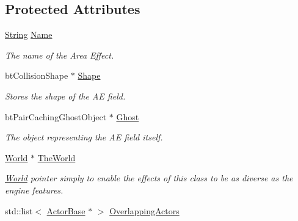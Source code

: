 \subsection*{Protected Attributes}
\begin{DoxyCompactItemize}
\item 
\hypertarget{classphys_1_1AreaEffect_a1cf5a878eb22b30a166f5b065944a986}{
\hyperlink{namespacephys_aa03900411993de7fbfec4789bc1d392e}{String} \hyperlink{classphys_1_1AreaEffect_a1cf5a878eb22b30a166f5b065944a986}{Name}}
\label{d4/d55/classphys_1_1AreaEffect_a1cf5a878eb22b30a166f5b065944a986}

\begin{DoxyCompactList}\small\item\em The name of the Area Effect. \item\end{DoxyCompactList}\item 
\hypertarget{classphys_1_1AreaEffect_af8189f9e8dc4bf04f44550918e0ee117}{
btCollisionShape $\ast$ \hyperlink{classphys_1_1AreaEffect_af8189f9e8dc4bf04f44550918e0ee117}{Shape}}
\label{d4/d55/classphys_1_1AreaEffect_af8189f9e8dc4bf04f44550918e0ee117}

\begin{DoxyCompactList}\small\item\em Stores the shape of the AE field. \item\end{DoxyCompactList}\item 
\hypertarget{classphys_1_1AreaEffect_ae730c591bf929404f337d71d4119bde8}{
btPairCachingGhostObject $\ast$ \hyperlink{classphys_1_1AreaEffect_ae730c591bf929404f337d71d4119bde8}{Ghost}}
\label{d4/d55/classphys_1_1AreaEffect_ae730c591bf929404f337d71d4119bde8}

\begin{DoxyCompactList}\small\item\em The object representing the AE field itself. \item\end{DoxyCompactList}\item 
\hypertarget{classphys_1_1AreaEffect_a3008e8e90236141ca4c21a9580e6f5de}{
\hyperlink{classphys_1_1World}{World} $\ast$ \hyperlink{classphys_1_1AreaEffect_a3008e8e90236141ca4c21a9580e6f5de}{TheWorld}}
\label{d4/d55/classphys_1_1AreaEffect_a3008e8e90236141ca4c21a9580e6f5de}

\begin{DoxyCompactList}\small\item\em \hyperlink{classphys_1_1World}{World} pointer simply to enable the effects of this class to be as diverse as the engine features. \item\end{DoxyCompactList}\item 
\hypertarget{classphys_1_1AreaEffect_a45834591f0ea49ba6657ce58d070ee9b}{
std::list$<$ \hyperlink{classphys_1_1ActorBase}{ActorBase} $\ast$ $>$ \hyperlink{classphys_1_1AreaEffect_a45834591f0ea49ba6657ce58d070ee9b}{OverlappingActors}}
\label{d4/d55/classphys_1_1AreaEffect_a45834591f0ea49ba6657ce58d070ee9b}


\end{DoxyCompactItemize}
